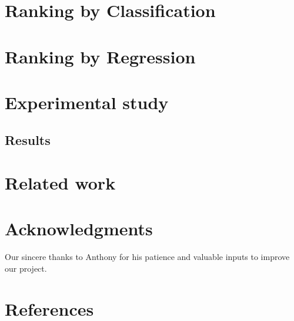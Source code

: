 \documentclass{article} %
\begin{document}
\section{Ranking by Classification}
\label{sec:ranking}
	
\section{Ranking by Regression}
\label{sec:regression}
	
\section{Experimental study}
\label{sec:experiment}
	
\subsection{Results}
\label{sec:results}
	
\section{Related work}
\label{sec:related}
	

\section*{Acknowledgments}
	Our sincere thanks to Anthony for his patience and valuable inputs to improve our project.

\section*{References}
\label{sec:references}
	
\end{document}

